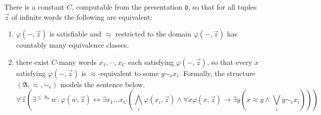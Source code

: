 \documentclass{stacs_proc}
\newcommand{\limp}{\rightarrow}
\newcommand{\eqe}{\sim_{\textrm{e}}}
\newcommand{\frakd}{\mathfrak{d}}
\newcommand{\frakA}{\mathfrak{A}}
\begin{document}
\begin{proposition} \label{prop_count}
There is a constant $C$, computable from the presentation $\frakd$, so that
for all tuples $\vec{z}$ of infinite words the following are equivalent:
\begin{enumerate}

\item $\varphi(-,\vec{z})$ is satisfiable and $\approx$ restricted to the 
      domain $\varphi(-,\vec{z})$ has countably many equivalence classes.

\item there exist $C$-many words $x_1, \cdots, x_C$ each satisfying
      $\varphi(-,\vec{z})$, so that every $x$ satisfying
      $\varphi(-,\vec{z})$ is $\approx$-equivalent to some $y \eqe x_i$. 
      Formally, the structure $(\frakA, \approx, \eqe)$ models the sentence below. 
\[
  \forall \vec{z} \left(
    \exists^{\leq \aleph_0} w \, . \, \varphi(w,\vec{z})  
  \longleftrightarrow  
    \exists x_1 \ldots x_C \left( 
      \bigwedge_i \varphi(x_i,\vec{z}) \land 
      \forall x \varphi(x,\vec{z}) \limp 
        \exists y (x \approx y \land \bigvee_i y \eqe x_i) 
    \right)
  \right)
\]
\end{enumerate}
\end{proposition}
\end{document}
